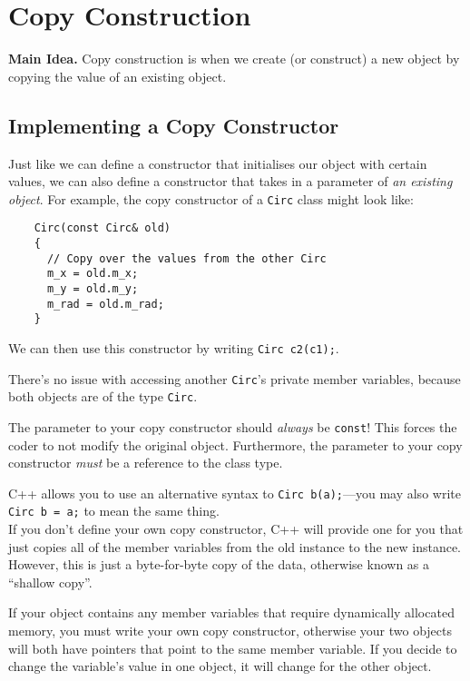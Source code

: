 \documentclass[class=article, crop=false]{standalone}
\begin{document}
  \section{Copy Construction}
  \textbf{Main Idea.} Copy construction is when we create (or construct) a new object by copying the value of an existing object.
  \subsection{Implementing a Copy Constructor}
  Just like we can define a constructor that initialises our object with certain values, we can also define a constructor that takes in a parameter of \emph{an existing object}. For example, the copy constructor of a \texttt{Circ} class might look like:
  \begin{lstlisting}
    Circ(const Circ& old)
    {
      // Copy over the values from the other Circ
      m_x = old.m_x;
      m_y = old.m_y;
      m_rad = old.m_rad;
    }
  \end{lstlisting}
  We can then use this constructor by writing \texttt{Circ c2(c1);}.
  \begin{note}{}
    There's no issue with accessing another \texttt{Circ}'s private member variables, because both objects are of the type \texttt{Circ}.
  \end{note}
  \begin{note}{}
    The parameter to your copy constructor should \emph{always} be \texttt{const}! This forces the coder to not modify the original object. Furthermore, the parameter to your copy constructor \emph{must} be a reference to the class type.
  \end{note}
  C++ allows you to use an alternative syntax to \texttt{Circ b(a);}---you may also write \texttt{Circ b = a;} to mean the same thing. \\[10pt]
  If you don't define your own copy constructor, C++ will provide one for you that just copies all of the member variables from the old instance to the new instance. However, this is just a byte-for-byte copy of the data, otherwise known as a ``shallow copy''.
  \begin{note}{}
    If your object contains any member variables that require dynamically allocated memory, you must write your own copy constructor, otherwise your two objects will both have pointers that point to the same member variable. If you decide to change the variable's value in one object, it will change for the other object.
  \end{note}
  \newpage
\end{document}
